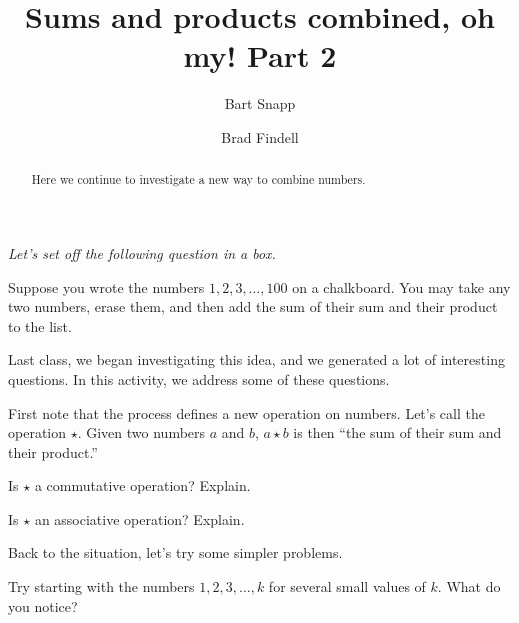 \documentclass{ximera}
\title{Sums and products combined, oh my!  Part 2}
\author{Bart Snapp \and Brad Findell}
\begin{document}
\begin{abstract}
Here we continue to investigate a new way to combine numbers.
\end{abstract}
\maketitle

\emph{Let's set off the following question in a box.} 

Suppose you wrote the numbers $1,2,3,\dots,100$ on a chalkboard. You
may take any two numbers, erase them, and then add the sum of their
sum and their product to the list.

Last class, we began investigating this idea, and we generated a lot of interesting questions.  
In this activity, we address some of these questions.  

First note that the process defines a new operation on numbers.  Let's call the operation $\star$.  Given two numbers $a$ and $b$,  $a\star b$ is then ``the sum of their sum and their product.''    

\begin{problem}
Is $\star$ a commutative operation?  Explain.  
\begin{freeResponse}
\end{freeResponse}
\vfill
\end{problem}

\begin{problem}
Is $\star$ an associative operation?  Explain.  
\begin{freeResponse}
%
\end{freeResponse}
\vfill
\end{problem}

\newpage
Back to the situation, let's try some simpler problems.  

\begin{problem}
Try starting with the numbers $1,2,3,\dots, k$ for several small values of $k$.  What do you notice?  
\begin{freeResponse}
\end{freeResponse}
\vfill
\end{problem}
\end{document}
